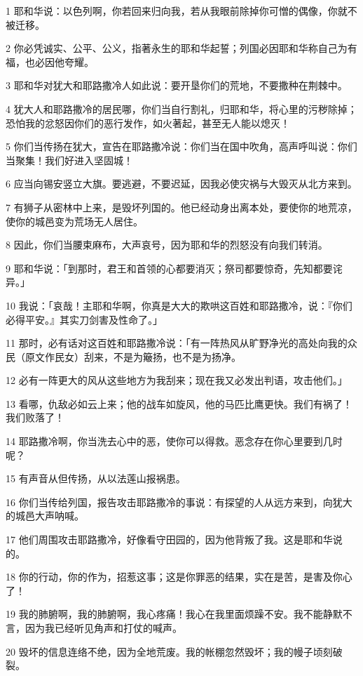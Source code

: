 \par 1 耶和华说：以色列啊，你若回来归向我，若从我眼前除掉你可憎的偶像，你就不被迁移。
\par 2 你必凭诚实、公平、公义，指著永生的耶和华起誓；列国必因耶和华称自己为有福，也必因他夸耀。
\par 3 耶和华对犹大和耶路撒冷人如此说：要开垦你们的荒地，不要撒种在荆棘中。
\par 4 犹大人和耶路撒冷的居民哪，你们当自行割礼，归耶和华，将心里的污秽除掉；恐怕我的忿怒因你们的恶行发作，如火著起，甚至无人能以熄灭！
\par 5 你们当传扬在犹大，宣告在耶路撒冷说：你们当在国中吹角，高声呼叫说：你们当聚集！我们好进入坚固城！
\par 6 应当向锡安竖立大旗。要逃避，不要迟延，因我必使灾祸与大毁灭从北方来到。
\par 7 有狮子从密林中上来，是毁坏列国的。他已经动身出离本处，要使你的地荒凉，使你的城邑变为荒场无人居住。
\par 8 因此，你们当腰束麻布，大声哀号，因为耶和华的烈怒没有向我们转消。
\par 9 耶和华说：「到那时，君王和首领的心都要消灭；祭司都要惊奇，先知都要诧异。」
\par 10 我说：「哀哉！主耶和华啊，你真是大大的欺哄这百姓和耶路撒冷，说：『你们必得平安。』其实刀剑害及性命了。」
\par 11 那时，必有话对这百姓和耶路撒冷说：「有一阵热风从旷野净光的高处向我的众民（原文作民女）刮来，不是为簸扬，也不是为扬净。
\par 12 必有一阵更大的风从这些地方为我刮来；现在我又必发出判语，攻击他们。」
\par 13 看哪，仇敌必如云上来；他的战车如旋风，他的马匹比鹰更快。我们有祸了！我们败落了！
\par 14 耶路撒冷啊，你当洗去心中的恶，使你可以得救。恶念存在你心里要到几时呢？
\par 15 有声音从但传扬，从以法莲山报祸患。
\par 16 你们当传给列国，报告攻击耶路撒冷的事说：有探望的人从远方来到，向犹大的城邑大声呐喊。
\par 17 他们周围攻击耶路撒冷，好像看守田园的，因为他背叛了我。这是耶和华说的。
\par 18 你的行动，你的作为，招惹这事；这是你罪恶的结果，实在是苦，是害及你心了！
\par 19 我的肺腑啊，我的肺腑啊，我心疼痛！我心在我里面烦躁不安。我不能静默不言，因为我已经听见角声和打仗的喊声。
\par 20 毁坏的信息连络不绝，因为全地荒废。我的帐棚忽然毁坏；我的幔子顷刻破裂。

